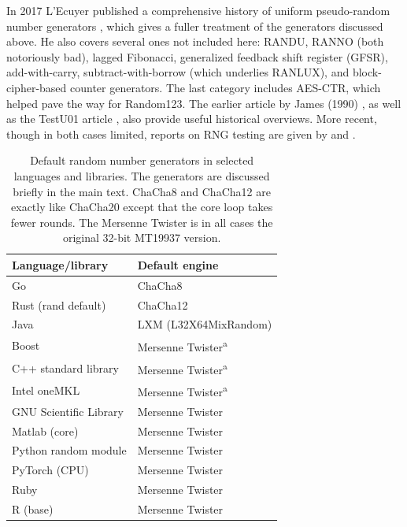 \documentclass[manuscript,screen,review]{acmart}
\begin{document}
In 2017 L'Ecuyer published a comprehensive history of uniform
pseudo-random number generators \cite{lecuyer2017history}, which gives
a fuller treatment of the generators discussed above. He also covers
several ones not included here: RANDU, RANNO (both notoriously bad),
lagged Fibonacci, generalized feedback shift register (GFSR),
add-with-carry, subtract-with-borrow (which underlies RANLUX), and
block-cipher-based counter generators. The last category includes
AES-CTR, which helped pave the way for Random123. The earlier article
by James (1990) \cite{james1990review}, as well as the TestU01 article
\cite{lecuyer2007testu01}, also provide useful historical overviews.
More recent, though in both cases limited, reports on RNG testing are
given by \cite{bhattacharjee2022search} and
\cite{josey2023reassessing}.

\begin{table}
\caption{Default random number generators in selected languages and
  libraries. The generators are discussed briefly in the main text.
  ChaCha8 and ChaCha12 are exactly like ChaCha20 except that the core
  loop takes fewer rounds. The Mersenne Twister is in all cases the
  original 32-bit MT19937 version.}
\label{tab:language-rngs}
\centering
\begin{minipage}{0.52\columnwidth}
\centering
\begin{tabular}{l@{\hspace{2.5em}}l}
\toprule
Language/library          & Default engine \\
\midrule
Go                        & ChaCha8 \\
Rust (rand default)       & ChaCha12 \\
Java                      & LXM (L32X64MixRandom) \\
Boost                     & Mersenne Twister\textsuperscript{a} \\
C++ standard library      & Mersenne Twister\textsuperscript{a} \\
Intel oneMKL              & Mersenne Twister\textsuperscript{a} \\
GNU Scientific Library    & Mersenne Twister \\
Matlab (core)             & Mersenne Twister \\
Python random module      & Mersenne Twister \\
PyTorch (CPU)             & Mersenne Twister \\
Ruby                      & Mersenne Twister \\
R (base)                  & Mersenne Twister \\

\end{tabular}
\end{minipage}
\end{table}
\end{document}

